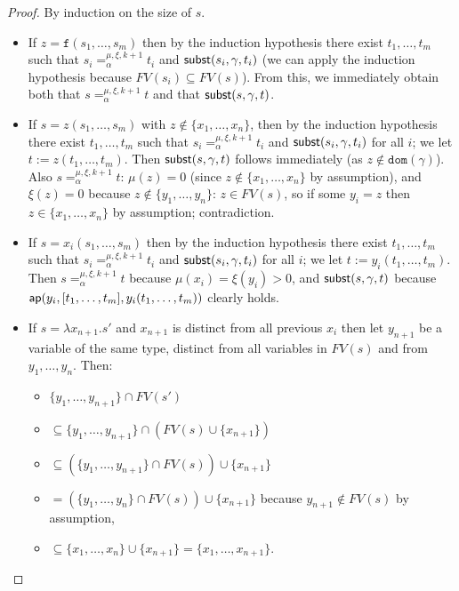 \documentclass{lmcs}
\theoremstyle{theorem}\newtheorem{theorem}[dummy]{Theorem}
\theoremstyle{theorem}\newtheorem{lemma}[dummy]{Lemma}
\theoremstyle{theorem}\newtheorem{corollary}[dummy]{Corollary}
\theoremstyle{definition}\newtheorem{definition}[dummy]{Definition}
\theoremstyle{definition}\newtheorem{example}[dummy]{Example}
\newcommand{\FV}{\mathit{FV}}
\newcommand{\domain}{\mathtt{dom}}
\newcommand{\identifier}[1]{\mathtt{#1}}
\newcommand{\afun}{\identifier{f}}
\newcommand{\abs}[2]{\lambda #1.#2}
\begin{document}
\begin{proof}
By induction on the size of $s$.

\begin{itemize}
\item
  If $z = \afun(s_1,\dots,s_m)$ then by the induction hypothesis there exist $t_1,\dots,t_m$ such
  that $s_i =_\alpha^{\mu,\xi,k+1} t_i$ and $\mathsf{subst}(s_i,\gamma,t_i)$ (we can apply the induction
  hypothesis because $\FV(s_i) \subseteq \FV(s)$).  From this, we immediately obtain both that
  $s =_\alpha^{\mu,\xi,k+1} t$ and that $\mathsf{subst}(s,\gamma,t)$.
\item
  If $s = z(s_1,\dots,s_m)$ with $z \notin \{x_1,\dots,x_n\}$, then by the induction hypothesis
  there exist $t_1,\dots,t_m$ such that $s_i =_\alpha^{\mu,\xi,k+1} t_i$ and $\mathsf{subst}(s_i,\gamma,
  t_i)$ for all $i$; we let $t := z(t_1,\dots,t_m)$.  Then $\mathsf{subst}(s,\gamma,t)$ follows
  immediately (as $z \notin \domain(\gamma)$).  Also $s =_\alpha^{\mu,\xi,k+1} t$: $\mu(z) = 0$
  (since $z \notin \{x_1,\dots,x_n\}$ by assumption), and $\xi(z) = 0$ because $z \notin \{y_1,
  \dots,y_n\}$: $z \in \FV(s)$, so if some $y_i = z$ then $z \in \{x_1,\dots,x_n\}$ by assumption;
  contradiction.
\item
  If $s = x_i(s_1,\dots,s_m)$ then by the induction hypothesis there exist $t_1,\dots,t_m$ such
  that $s_i =_\alpha^{\mu,\xi,k+1} t_i$ and $\mathsf{subst}(s_i,\gamma,t_i)$ for all $i$; we let
  $t := y_i(t_1,\dots,t_m)$.  Then $s =_\alpha^{\mu,\xi,k+1} t$ because $\mu(x_i) = \xi(y_i) > 0$,
  and $\mathsf{subst}(s,\gamma,t)$ because $\mathsf{ap}(y_i,[t_1,\dots,t_m],y_i(t_1,\dots,t_m))$ clearly holds.
\item 
  If $s = \abs{x_{n+1}}{s'}$ and $x_{n+1}$ is distinct from all previous $x_i$ then let
  $y_{n+1}$ be a variable of the same type, distinct from all variables in $\FV(s)$ and from
  $y_1,\dots,y_n$.
  Then:
  \begin{itemize}
  \item[] $\{y_1,\dots,y_{n+1}\} \cap \FV(s')$
  \item[] $\subseteq \{ y_1,\dots,y_{n+1}\} \cap (\FV(s) \cup \{x_{n+1}\})$
  \item[] $\subseteq (\{ y_1,\dots,y_{n+1}\} \cap \FV(s)) \cup \{ x_{n+1} \}$
  \item[] $= (\{ y_1,\dots,y_n \} \cap \FV(s)) \cup \{x_{n+1}\}$ because $y_{n+1} \notin \FV(s)$ by
    assumption,
  \item[] $\subseteq \{ x_1,\dots,x_n \} \cup \{ x_{n+1} \} = \{ x_1,\dots,x_{n+1} \}$. \\

\end{itemize}
\end{itemize}
\end{proof}
\end{document}
